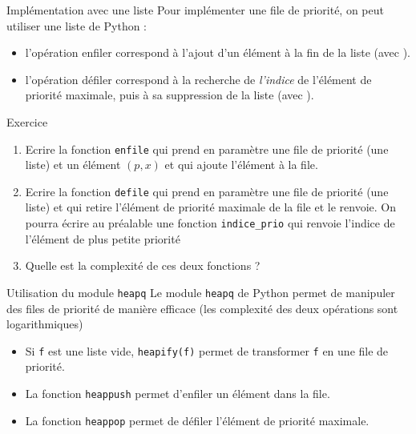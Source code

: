 \documentclass[10pt,french]{beamer}
\begin{document}
\begin{frame}{\Ctitle}{\stitle}
	\begin{block}{Implémentation avec une liste}
		Pour implémenter une file de priorité, on peut utiliser une liste de Python :
		\begin{itemize}
			\item l'opération enfiler correspond à l'ajout d'un élément à la fin de la liste (avec ).
			\item l'opération défiler correspond à la recherche de \textit{l'indice} de l'élément de priorité maximale, puis à sa suppression de la liste (avec ).
		\end{itemize}
	\end{block}

	\begin{exampleblock}{Exercice}
		\begin{enumerate}
			\item Ecrire la fonction {\tt enfile} qui prend en paramètre une file de priorité (une liste) et un élément $(p,x)$ et qui ajoute l'élément à la file.
			\item Ecrire la fonction {\tt defile} qui prend en paramètre une file de priorité (une liste) et qui retire l'élément de priorité maximale de la file et le renvoie. On pourra écrire au préalable une fonction {\tt indice\_prio} qui renvoie l'indice de l'élément de plus petite priorité
			\item Quelle est la complexité de ces deux fonctions ?
		\end{enumerate}
	\end{exampleblock}
\end{frame}

\begin{frame}{\Ctitle}{\stitle}
	\begin{block}{Utilisation du module \texttt{heapq}}
		Le module \texttt{heapq} de Python permet de manipuler des files de priorité de manière efficace (les complexité des deux opérations sont logarithmiques)
		\begin{itemize}
			\item Si {\tt f} est une liste vide, \texttt{heapify(f)} permet de transformer {\tt f} en une file de priorité.
			\item La fonction \texttt{heappush} permet d'enfiler un élément dans la file.
			\item La fonction \texttt{heappop} permet de défiler l'élément de priorité maximale.
		\end{itemize}
	\end{block}
\end{frame}
\end{document}
